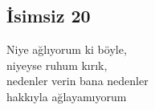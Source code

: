 \subsection{İsimsiz 20}

Niye ağlıyorum ki böyle, \\
niyeyse ruhum kırık, \\
nedenler verin bana nedenler \\
hakkıyla ağlayamıyorum